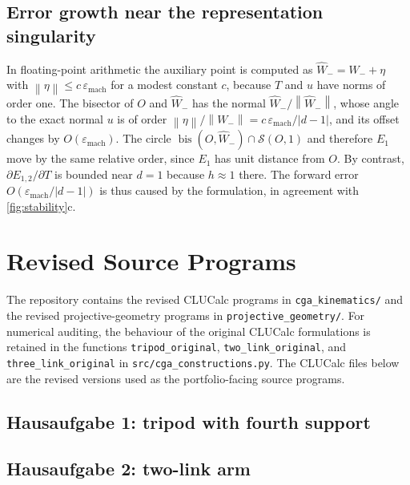 \documentclass[11pt,a4paper]{article}
\theoremstyle{plain}
\theoremstyle{definition}
\theoremstyle{remark}
\newcommand{\norm}[1]{\left\lVert#1\right\rVert}
\newcommand{\abs}[1]{\left\lvert#1\right\rvert}
\newcommand{\bis}{\operatorname{bis}}
\newcommand{\Sph}{\mathcal{S}}
\begin{document}
\subsection{Error growth near the representation singularity}\label{app:epsilon}

In floating-point arithmetic the auxiliary point is computed as
$\widehat W_-=W_-+\eta$ with $\norm{\eta}\le c\,\varepsilon_{\mathrm{mach}}$ for a
modest constant $c$, because $T$ and $u$ have norms of order one. The bisector of
$O$ and $\widehat W_-$ has the normal $\widehat W_-/\norm{\widehat W_-}$, whose
angle to the exact normal $u$ is of order $\norm{\eta}/\norm{W_-}=
c\,\varepsilon_{\mathrm{mach}}/\abs{d-1}$, and its offset changes by
$O(\varepsilon_{\mathrm{mach}})$. The circle $\bis(O,\widehat W_-)\cap\Sph(O,1)$
and therefore $E_1$ move by the same relative order, since $E_1$ has unit
distance from $O$. By contrast, $\partial E_{1,2}/\partial T$ is bounded near
$d=1$ because $h\approx1$ there. The forward error
$O(\varepsilon_{\mathrm{mach}}/\abs{d-1})$ is thus caused by the formulation,
in agreement with \cref{fig:stability}c.

\section{Revised Source Programs}\label{app:programs}

The repository contains the revised CLUCalc programs in
\texttt{cga\_kinematics/} and the revised projective-geometry programs in
\texttt{projective\_geometry/}. For numerical auditing, the behaviour of the
original CLUCalc formulations is retained in the functions
\texttt{tripod\_original}, \texttt{two\_link\_original}, and
\texttt{three\_link\_original} in
\texttt{src/cga\_constructions.py}. The CLUCalc files below are the revised
versions used as the portfolio-facing source programs.

\subsection{Hausaufgabe 1: tripod with fourth support}


\subsection{Hausaufgabe 2: two-link arm}

\end{document}

